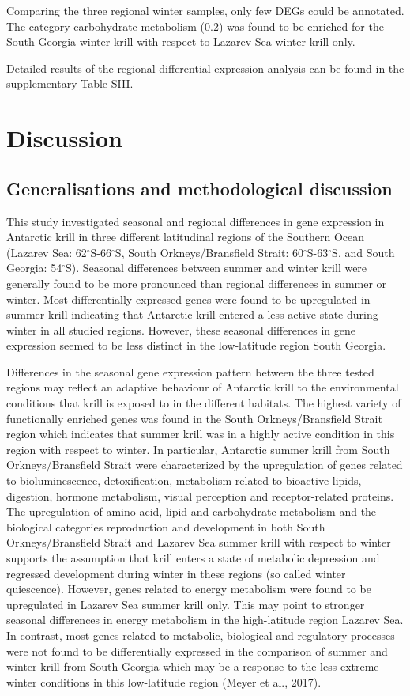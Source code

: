 Comparing the three regional winter samples, only few DEGs could be annotated.
The category  carbohydrate metabolism (0.2) was found to be enriched for the
South Georgia winter krill with respect to Lazarev Sea winter krill only. 

Detailed  results of the regional differential expression analysis
can be found in the supplementary Table SIII.

\section{Discussion}

\subsection*{Generalisations and methodological discussion}

This study investigated seasonal and regional differences in gene expression in
Antarctic krill in three different latitudinal regions of the Southern Ocean
(Lazarev Sea: 62$^{\circ}$S-66$^{\circ}$S, South Orkneys/Bransfield Strait:
60$^{\circ}$S-63$^{\circ}$S, and South Georgia: 54$^{\circ}$S). Seasonal
differences between summer and winter krill were generally found to be more
pronounced than regional differences in summer or winter. Most differentially
expressed genes were found to be upregulated in summer krill indicating that
Antarctic krill entered a less active state during winter in all studied
regions. However, these seasonal differences in gene expression seemed to be
less distinct in the low-latitude region South Georgia.

Differences in the seasonal gene expression pattern between the three tested
regions may reflect an adaptive behaviour of Antarctic krill to the
environmental conditions that krill is exposed to in the different habitats.
The highest variety of functionally enriched genes was found in the South
Orkneys/Bransfield Strait region which indicates that summer krill was in a
highly active condition in this region with respect to winter. In particular,
Antarctic summer krill from South Orkneys/Bransfield Strait were characterized
by the upregulation of genes related to bioluminescence, detoxification,
metabolism related to bioactive lipids, digestion, hormone metabolism, visual
perception and receptor-related proteins. The upregulation of amino acid, lipid
and carbohydrate metabolism and the biological categories reproduction and
development in both South Orkneys/Bransfield Strait and Lazarev Sea summer
krill with respect to winter supports the assumption that krill enters a state
of metabolic depression and regressed development during winter in these
regions (so called winter quiescence). However, genes related to energy
metabolism were found to be upregulated in Lazarev Sea summer krill only. This
may point to stronger seasonal differences in energy metabolism in the
high-latitude region Lazarev Sea. In contrast, most genes related to metabolic,
biological and regulatory processes were not found to be differentially
expressed in the comparison of summer and winter krill from South Georgia which
may be a response to the less extreme winter conditions in this low-latitude
region (Meyer et al., 2017).

